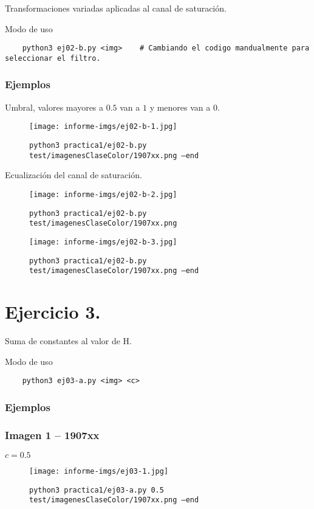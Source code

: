 \documentclass[11pt, spanish]{article}
\begin{document}
Transformaciones variadas aplicadas al canal de saturación.

Modo de uso
\begin{verbatim}
    python3 ej02-b.py <img>    # Cambiando el codigo mandualmente para seleccionar el filtro.
\end{verbatim}

\subsubsection*{Ejemplos}

Umbral, valores mayores a $0.5$ van a $1$ y menores van a $0$.
\begin{figure}[H]
\centering
  \texttt{[image: informe-imgs/ej02-b-1.jpg]}
  \caption{\texttt{python3 practica1/ej02-b.py test/imagenesClaseColor/1907xx.png --end}}
\end{figure}

Ecualización del canal de saturación.
\begin{figure}[H]
\centering
  \texttt{[image: informe-imgs/ej02-b-2.jpg]}
  \caption{\texttt{python3 practica1/ej02-b.py test/imagenesClaseColor/1907xx.png}}
\end{figure}
\begin{figure}[H]
\centering
  \texttt{[image: informe-imgs/ej02-b-3.jpg]}
  \caption{\texttt{python3 practica1/ej02-b.py test/imagenesClaseColor/1907xx.png --end}}
\end{figure}

\newpage

\section{Ejercicio 3.}

Suma de constantes al valor de H.

Modo de uso
\begin{verbatim}
    python3 ej03-a.py <img> <c>
\end{verbatim}

\subsubsection*{Ejemplos}
\subsubsection*{Imagen 1 -- 1907xx}
$c = 0.5$
\begin{figure}[H]
\centering
  \texttt{[image: informe-imgs/ej03-1.jpg]}
  \caption{\texttt{python3 practica1/ej03-a.py 0.5 test/imagenesClaseColor/1907xx.png --end}}
\end{figure}
\end{document}
